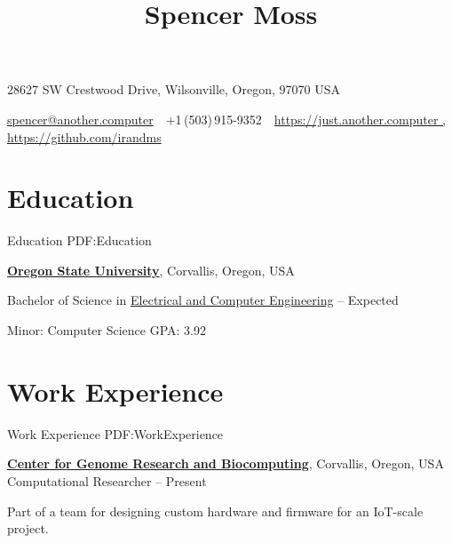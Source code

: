 \documentclass[letterpaper,MMMyyyy,nonstop]{simpleresumecv}
\newcommand{\CVAuthor}{Spencer Moss}
\newcommand{\CVWebpage}{https://just.another.computer , https://github.com/irandms}
\begin{document}

\title{\CVAuthor}

\begin{subtitle}
    28627 SW Crestwood Drive, Wilsonville, Oregon, 97070 USA

\par
\href{mailto:spencer@another.computer}
{spencer@another.computer}
\,\SubBulletSymbol\,
+1\,(503)\,915-9352
\,\SubBulletSymbol\,
\href{\CVWebpage}
{\CVWebpage}
\end{subtitle}

\begin{body}


\section
{Education}
{Education}
{PDF:Education}

\href{http://www.oregonstate.edu/}
{\textbf{Oregon State University}},
Corvallis, Oregon, USA

\GapNoBreak
\BulletItem
Bachelor of Science in
\href{http://www.eecs.oregonstate.edu/}
{Electrical and Computer Engineering}
\hfill
{} -- Expected 
\begin{detail}
\SubBulletItem
Minor: Computer Science
\SubBulletItem
GPA: 3.92
\iffalse
\SubBulletItem
Current Interest Areas:
FOSS/Linux, Embedded Systems, Controls/Sensor Systems, Computer Architecture, VLSI
\fi
\end{detail}


\section
{Work\newline
Experience}
{Work Experience}
{PDF:WorkExperience}

\href{http://cgrb.oregonstate.edu/}
{\textbf{Center for Genome Research and Biocomputing}},
Corvallis, Oregon, USA
\GapNoBreak
\BulletItem
Computational Researcher
\hfill
{} --
Present
\begin{detail}
\SubBulletItem
Part of a team for designing custom hardware and firmware for an IoT-scale project.
\end{detail}


\end{body}
\end{document}
